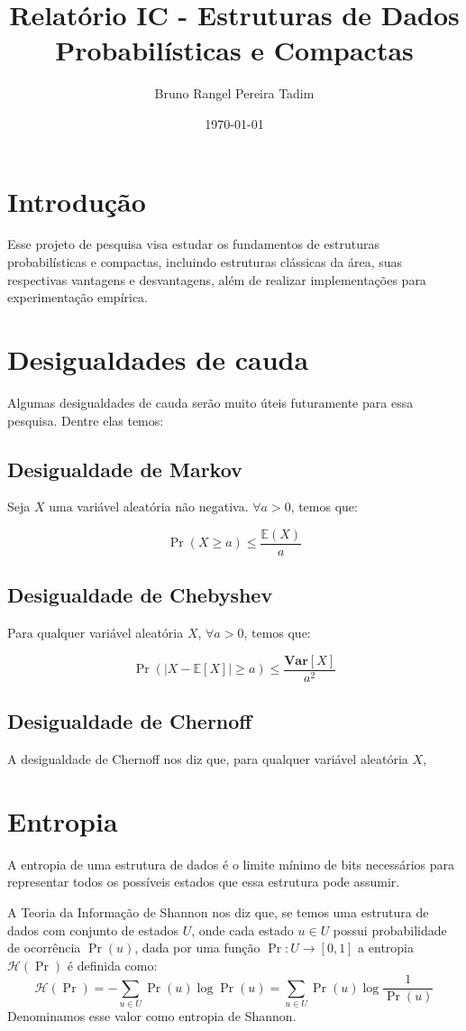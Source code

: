 \documentclass[a4paper, 12pt, english, brazilian]{article}
\title{Relatório IC - Estruturas de Dados Probabilísticas e Compactas}
\author{Bruno Rangel Pereira Tadim}
\date{\today}
\begin{document}
\maketitle

\section{Introdução}
Esse projeto de pesquisa visa estudar os fundamentos de estruturas probabilísticas e compactas, 
incluindo estruturas clássicas da área, suas respectivas vantagens e desvantagens, além de realizar implementações
para experimentação empírica.

\section{Desigualdades de cauda}
Algumas desigualdades de cauda serão muito úteis futuramente para essa pesquisa. Dentre elas temos:

\subsection{Desigualdade de Markov}
Seja $X$ uma variável aleatória não negativa. $\forall a > 0$, temos que:

\[
\Pr(X \ge a) \le \frac{\mathbb{E}(X)}{a}
\]

\subsection{Desigualdade de Chebyshev}
Para qualquer variável aleatória $X$, $\forall a > 0$, temos que:

\[
    \Pr(|X - \mathbb{E}[X]| \ge a) \le \frac{\mathbf{Var}[X]}{a^2}
\]

\subsection{Desigualdade de Chernoff}
A desigualdade de Chernoff nos diz que, para qualquer variável aleatória $X$, 

\section{Entropia}
A entropia de uma estrutura de dados é o limite mínimo de bits necessários para representar 
todos os possíveis estados que essa estrutura pode assumir.

A Teoria da Informação de Shannon nos diz que, se temos uma estrutura de dados com conjunto 
de estados $U$, onde cada estado $u \in U$ possui probabilidade de ocorrência $\Pr(u)$, dada por uma função $\Pr : U \to [0, 1]$
a entropia $\mathcal{H}(\Pr)$ é definida como:
\[
    \mathcal{H}(\Pr) = -\sum_{u \in U}{\Pr(u)\log\Pr(u)} = \sum_{u \in U}{\Pr(u)\log\frac{1}{\Pr(u)}}
\]
Denominamos esse valor como entropia de Shannon.
\end{document}
